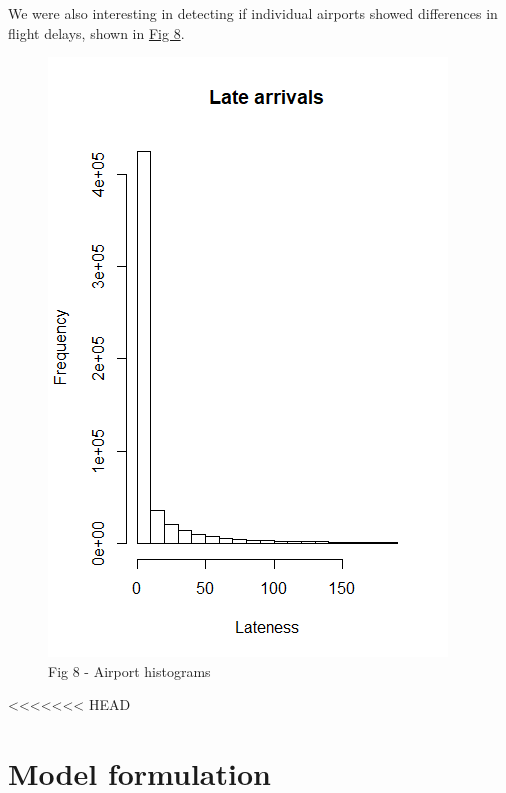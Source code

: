 \documentclass[12pt, a4paper]{book}
\newcommand\tab[1][1cm]{\hspace*{#1}}
\begin{document}
			\tab We were also interesting in detecting if individual airports showed differences in flight delays, shown in \underline{Fig 8}. 
			\begin{figure}[h]
	 		\includegraphics[width = 1 \textwidth]{../figures/LateArrivalsHistogram}
	 		\caption{Fig 8 - Airport histograms}
	 		\end{figure}
	 		
<<<<<<< HEAD
\chapter{Model formulation}
\end{document}
